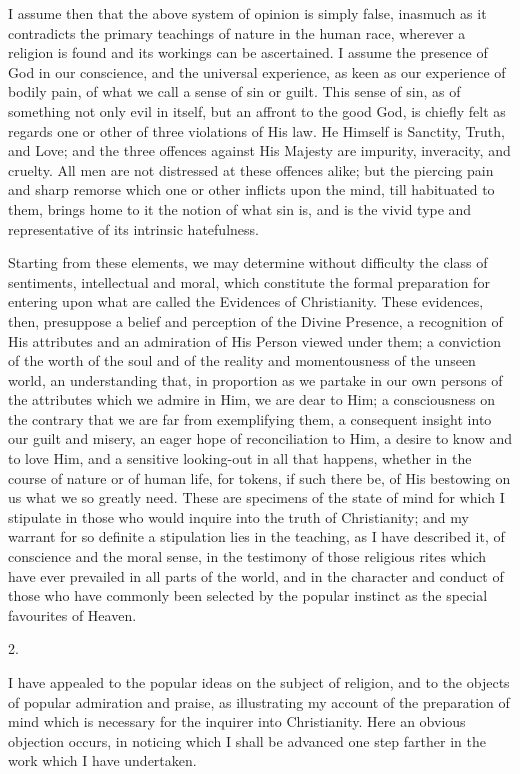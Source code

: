 I assume then that the above system of opinion is simply false,
inasmuch as it contradicts the primary teachings of nature in the
human race, wherever a religion is found and its workings can be
ascertained. I assume the presence of God in our conscience, and the
universal experience, as keen as our experience of bodily pain, of
what we call a sense of sin or guilt. This sense of sin, as of
something not only evil in itself, but an affront to the good God, is
chiefly felt as regards one or other of three violations of His law.
He Himself is Sanctity, Truth, and Love; and the three offences
against His Majesty are impurity, inveracity, and cruelty. All men are
not distressed at these offences alike; but the piercing pain and
sharp remorse which one or other inflicts upon the mind, till
habituated to them, brings home to it the notion of what sin is, and
is the vivid type and representative of its intrinsic hatefulness.

Starting from these elements, we may determine without difficulty
the class of sentiments, intellectual and moral, which constitute the
formal preparation for entering upon what are called the Evidences of
Christianity. These evidences, then, presuppose a belief and
perception of the Divine Presence, a recognition of His attributes and
an admiration of His Person viewed under them; a conviction of the
worth of the soul and of the reality and momentousness of the unseen
world, an understanding that, in proportion as we partake in our own
persons of the attributes which we admire in Him, we are dear to Him;
a consciousness on the contrary that we are far from exemplifying
them, a consequent insight into our guilt and misery, an eager hope of
reconciliation to Him, a desire to know and to love Him, and a
sensitive looking-out in all that happens, whether in the course of
nature or of human life, for tokens, if such there be, of His
bestowing on us what we so greatly need. These are specimens of the
state of mind for which I stipulate in those who would inquire into
the truth of Christianity; and my warrant for so definite a
stipulation lies in the teaching, as I have described it, of
conscience and the moral sense, in the testimony of those religious
rites which have ever prevailed in all parts of the world, and in the
character and conduct of those who have commonly been selected by the
popular instinct as the special favourites of Heaven.

2.

I have appealed to the popular ideas on the subject of religion,
and to the objects of popular admiration and praise, as illustrating
my account of the preparation of mind which is necessary for the
inquirer into Christianity. Here an obvious objection occurs, in
noticing which I shall be advanced one step farther in the work which
I have undertaken.

